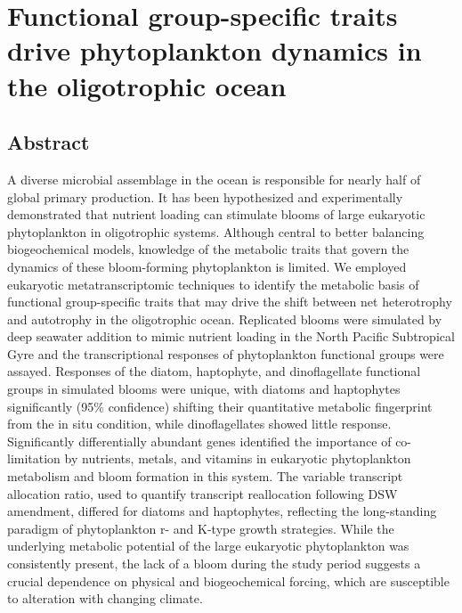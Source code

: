 

\chapter{Functional group-specific traits drive phytoplankton dynamics in the oligotrophic ocean}

\raggedbottom

\section{Abstract} 
A diverse microbial assemblage in the ocean is responsible for nearly half of global primary production. It has been hypothesized and experimentally demonstrated that nutrient loading can stimulate blooms of large eukaryotic phytoplankton in oligotrophic systems. Although central to better balancing biogeochemical models, knowledge of the metabolic traits that govern the dynamics of these bloom-forming phytoplankton is limited. We employed eukaryotic metatranscriptomic techniques to identify the metabolic basis of functional group-specific traits that may drive the shift between net heterotrophy and autotrophy in the oligotrophic ocean. Replicated blooms were simulated by deep seawater addition to mimic nutrient loading in the North Pacific Subtropical Gyre and the transcriptional responses of phytoplankton functional groups were assayed. Responses of the diatom, haptophyte, and dinoflagellate functional groups in simulated blooms were unique, with diatoms and haptophytes significantly (95\% confidence) shifting their quantitative metabolic fingerprint from the in situ condition, while dinoflagellates showed little response. Significantly differentially abundant genes identified the importance of co-limitation by nutrients, metals, and vitamins in eukaryotic phytoplankton metabolism and bloom formation in this system. The variable transcript allocation ratio, used to quantify transcript reallocation following DSW amendment, differed for diatoms and haptophytes, reflecting the long-standing paradigm of phytoplankton r- and K-type growth strategies. While the underlying metabolic potential of the large eukaryotic phytoplankton was consistently present, the lack of a bloom during the study period suggests a crucial dependence on physical and biogeochemical forcing, which are susceptible to alteration with changing climate. 
 
